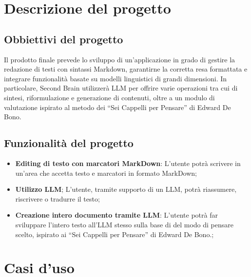 \newpage

\section{Descrizione del progetto}

\subsection{Obbiettivi del progetto}
Il prodotto finale prevede lo sviluppo di un’applicazione
in grado di gestire la redazione di testi con sintassi
Markdown, garantirne la corretta resa formattata e
integrare funzionalità basate su modelli linguistici
di grandi dimensioni. In particolare, Second Brain
utilizzerà LLM per offrire varie operazioni tra
cui di sintesi, riformulazione e generazione di contenuti, 
oltre a un modulo di valutazione ispirato al metodo dei 
“Sei Cappelli per Pensare” di Edward De Bono.

\subsection{Funzionalità del progetto}

\begin{itemize}
    \item \textbf{Editing di testo con marcatori MarkDown}:
	L'utente potrà scrivere in un'area che accetta
    testo e marcatori in formato MarkDown;
    \item \textbf{Utilizzo LLM}; L'utente, 
	tramite supporto di un LLM, potrà riassumere,
	riscrivere o tradurre il testo;
    \item \textbf{Creazione intero documento tramite LLM}: 
	L'utente potrà far sviluppare l'intero testo all'LLM stesso
	sulla base di del modo di pensare scelto,
	ispirato ai “Sei Cappelli per Pensare” di Edward
	De Bono.;
\end{itemize}

\newpage

\section{Casi d'uso}


